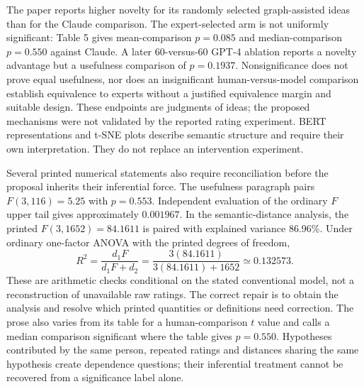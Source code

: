 The paper reports higher novelty for its randomly selected graph-assisted ideas than for the Claude comparison. The expert-selected arm is not uniformly significant: Table 5 gives mean-comparison $p=0.085$ and median-comparison $p=0.550$ against Claude. A later 60-versus-60 GPT-4 ablation reports a novelty advantage but a usefulness comparison of $p=0.1937$. Nonsignificance does not prove equal usefulness, nor does an insignificant human-versus-model comparison establish equivalence to experts without a justified equivalence margin and suitable design. These endpoints are judgments of ideas; the proposed mechanisms were not validated by the reported rating experiment. BERT representations and t-SNE plots describe semantic structure and require their own interpretation. They do not replace an intervention experiment.\citep{exec20_hypothesis_generation}

Several printed numerical statements also require reconciliation before the proposal inherits their inferential force. The usefulness paragraph pairs $F(3,116)=5.25$ with $p=0.553$. Independent evaluation of the ordinary $F$ upper tail gives approximately $0.001967$. In the semantic-distance analysis, the printed $F(3,1652)=84.1611$ is paired with explained variance 86.96\%. Under ordinary one-factor ANOVA with the printed degrees of freedom,
\begin{equation}
 R^2=\frac{d_1F}{d_1F+d_2}
     =\frac{3(84.1611)}{3(84.1611)+1652}
     \simeq 0.132573.
 \label{exec20:hypothesis-anova}
\end{equation}
These are arithmetic checks conditional on the stated conventional model, not a reconstruction of unavailable raw ratings. The correct repair is to obtain the analysis and resolve which printed quantities or definitions need correction. The prose also varies from its table for a human-comparison $t$ value and calls a median comparison significant where the table gives $p=0.550$. Hypotheses contributed by the same person, repeated ratings and distances sharing the same hypothesis create dependence questions; their inferential treatment cannot be recovered from a significance label alone.\citep{exec20_hypothesis_generation,exec20_hypothesis_reference}

